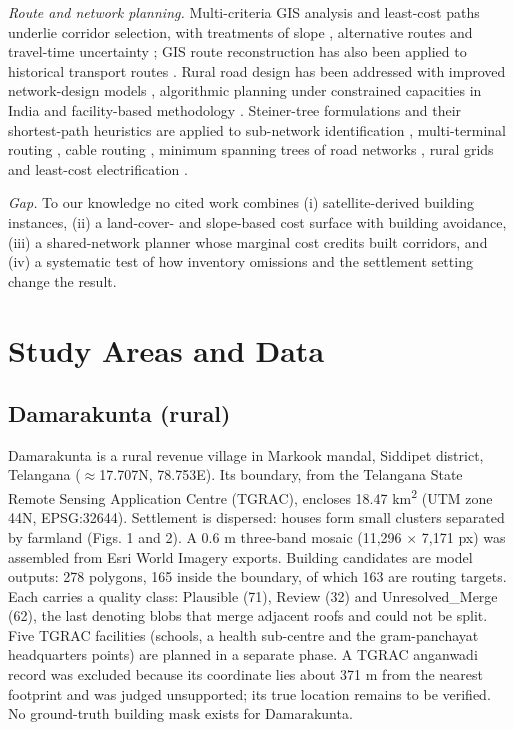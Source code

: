 \documentclass[journal]{IEEEtran}
\begin{document}
\textit{Route and network planning.} Multi-criteria GIS analysis \cite{r06} and least-cost paths \cite{collischonn2000lcp,r53,r54} underlie corridor selection, with treatments of slope \cite{r54}, alternative routes \cite{r53} and travel-time uncertainty \cite{r61}; GIS route reconstruction has also been applied to historical transport routes \cite{r55}. Rural road design has been addressed with improved network-design models \cite{r41}, algorithmic planning under constrained capacities in India \cite{r43} and facility-based methodology \cite{r44}. Steiner-tree formulations \cite{hwang1992steiner} and their shortest-path heuristics \cite{kou1981steiner,mehlhorn1988steiner} are applied to sub-network identification \cite{r51}, multi-terminal routing \cite{r52}, cable routing \cite{r45}, minimum spanning trees of road networks \cite{r46}, rural grids \cite{r47} and least-cost electrification \cite{r50}.

\textit{Gap.} To our knowledge no cited work combines (i) satellite-derived building instances, (ii) a land-cover- and slope-based cost surface with building avoidance, (iii) a shared-network planner whose marginal cost credits built corridors, and (iv) a systematic test of how inventory omissions and the settlement setting change the result.

\section{Study Areas and Data}

\subsection{Damarakunta (rural)}

Damarakunta is a rural revenue village in Markook mandal, Siddipet district, Telangana ($\approx$17.707\textdegree{}N, 78.753\textdegree{}E). Its boundary, from the Telangana State Remote Sensing Application Centre (TGRAC), encloses 18.47 km\textsuperscript{2} (UTM zone 44N, EPSG:32644). Settlement is dispersed: houses form small clusters separated by farmland (Figs. 1 and 2). A 0.6 m three-band mosaic (11,296 $\times$ 7,171 px) was assembled from Esri World Imagery exports. Building candidates are model outputs: 278 polygons, 165 inside the boundary, of which 163 are routing targets. Each carries a quality class: Plausible (71), Review (32) and Unresolved\_Merge (62), the last denoting blobs that merge adjacent roofs and could not be split. Five TGRAC facilities (schools, a health sub-centre and the gram-panchayat headquarters points) are planned in a separate phase. A TGRAC anganwadi record was excluded because its coordinate lies about 371 m from the nearest footprint and was judged unsupported; its true location remains to be verified. No ground-truth building mask exists for Damarakunta.
\end{document}
